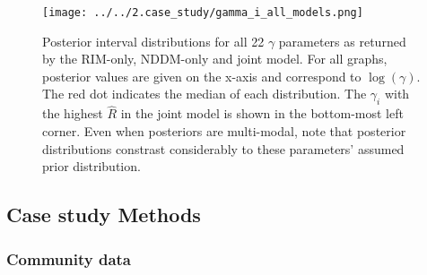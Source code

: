 \begin{refsection}
    \begin{figure}[H]
        \texttt{[image: ../../2.case\_study/gamma\_i\_all\_models.png]}
        \caption{Posterior interval distributions for all 22 $\gamma$ parameters as returned by the RIM-only, NDDM-only and joint model. For all graphs, posterior values are given on the x-axis and correspond to $\log(\gamma)$. The red dot indicates the median of each distribution. The $\gamma_i$ with the highest $\hat{R}$ in the joint model is shown in the bottom-most left corner. Even when posteriors are multi-modal, note that posterior distributions constrast considerably to these parameters' assumed prior distribution.}
        \label{fig:gamma_all}
    \end{figure}

    \restoregeometry


    \subsection{Case study Methods}
    \label{SI:casestudy}

        \subsubsection{Community data}


\end{refsection}
